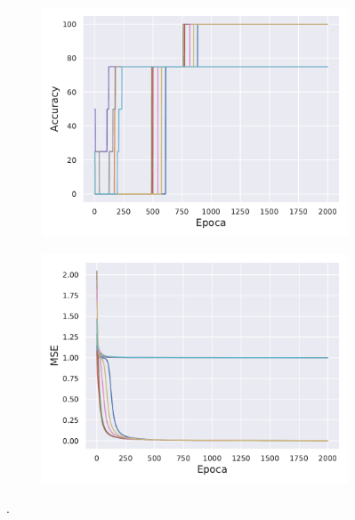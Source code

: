 \begin{figure}[h!]
    \centering
    \begin{subfigure}[h]{0.49\textwidth} 
        \includegraphics[width=\textwidth]{Figuras/ej1_2daArquitectura/Acc.pdf}
    \end{subfigure}       
    \begin{subfigure}[h]{0.49\textwidth} 
        \includegraphics[width=\textwidth]{Figuras/ej1_2daArquitectura/Loss.pdf}
    \end{subfigure}
    \caption{.} \label{fig:1_2daArquitectura}
\end{figure}